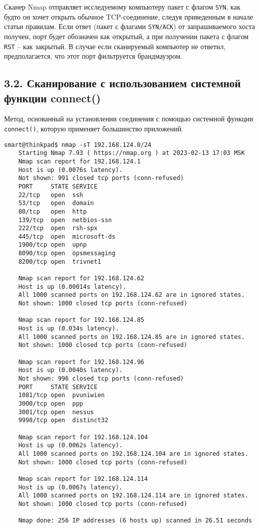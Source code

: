 Сканер Nmap отправляет исследуемому компьютеру пакет с флагом \texttt{SYN}, как будто он хочет открыть обычное TCP-соединение, следуя приведенным в начале статьи правилам. Если ответ (пакет с флагами \texttt{SYN/ACK}) от запрашиваемого хоста получен, порт будет обозначен как открытый, а при получении пакета с флагом \texttt{RST} -- как закрытый. В случае если сканируемый компьютер не ответил, предполагается, что этот порт фильтруется брандмауэром.

\subsection*{3.2. Сканирование с использованием системной функции connect()}

Метод, основанный на установлении соединения с помощью системной функции \texttt{connect()}, которую применяет большинство приложений.

\begin{Verbatim}[frame=single,breaklines=true,breakanywhere=true]
    smart@thinkpad$ nmap -sT 192.168.124.0/24
    Starting Nmap 7.93 ( https://nmap.org ) at 2023-02-13 17:03 MSK
    Nmap scan report for 192.168.124.1
    Host is up (0.0076s latency).
    Not shown: 991 closed tcp ports (conn-refused)
    PORT     STATE SERVICE
    22/tcp   open  ssh
    53/tcp   open  domain
    80/tcp   open  http
    139/tcp  open  netbios-ssn
    222/tcp  open  rsh-spx
    445/tcp  open  microsoft-ds
    1900/tcp open  upnp
    8090/tcp open  opsmessaging
    8200/tcp open  trivnet1

    Nmap scan report for 192.168.124.62
    Host is up (0.00014s latency).
    All 1000 scanned ports on 192.168.124.62 are in ignored states.
    Not shown: 1000 closed tcp ports (conn-refused)

    Nmap scan report for 192.168.124.85
    Host is up (0.034s latency).
    All 1000 scanned ports on 192.168.124.85 are in ignored states.
    Not shown: 1000 closed tcp ports (conn-refused)

    Nmap scan report for 192.168.124.96
    Host is up (0.0040s latency).
    Not shown: 996 closed tcp ports (conn-refused)
    PORT     STATE SERVICE
    1081/tcp open  pvuniwien
    3000/tcp open  ppp
    3001/tcp open  nessus
    9998/tcp open  distinct32

    Nmap scan report for 192.168.124.104
    Host is up (0.0062s latency).
    All 1000 scanned ports on 192.168.124.104 are in ignored states.
    Not shown: 1000 closed tcp ports (conn-refused)

    Nmap scan report for 192.168.124.114
    Host is up (0.0067s latency).
    All 1000 scanned ports on 192.168.124.114 are in ignored states.
    Not shown: 1000 closed tcp ports (conn-refused)

    Nmap done: 256 IP addresses (6 hosts up) scanned in 26.51 seconds
\end{Verbatim}

